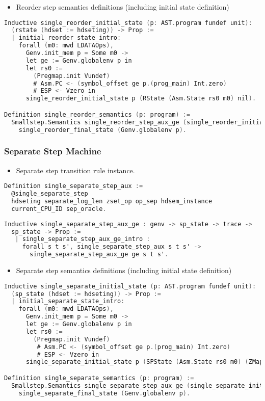 \begin{itemize}[leftmargin=*]
\item Reorder step semantics definitions (including initial state definition)
\end{itemize}
\begin{lstlisting}[language=C]
Inductive single_reorder_initial_state (p: AST.program fundef unit): 
  (rstate (hdset := hdseting)) -> Prop :=
  | initial_reorder_state_intro: 
    forall (m0: mwd LDATAOps),
      Genv.init_mem p = Some m0 ->
      let ge := Genv.globalenv p in
      let rs0 :=
        (Pregmap.init Vundef)
        # Asm.PC <- (symbol_offset ge p.(prog_main) Int.zero)
        # ESP <- Vzero in
      single_reorder_initial_state p (RState (Asm.State rs0 m0) nil).

Definition single_reorder_semantics (p: program) :=
  Smallstep.Semantics single_reorder_step_aux_ge (single_reorder_initial_state p) 
    single_reorder_final_state (Genv.globalenv p).
\end{lstlisting}

\subsubsection{Separate Step Machine}
\begin{itemize}[leftmargin=*]
\item Separate step transition rule instance.
\end{itemize}
\begin{lstlisting}[language=C]
Definition single_separate_step_aux :=
  @single_separate_step
  hdseting separate_log_len zset_op op_sep hdsem_instance
  current_CPU_ID sep_oracle.
    
Inductive single_separate_step_aux_ge : genv -> sp_state -> trace -> 
  sp_state -> Prop :=
   | single_separate_step_aux_ge_intro : 
     forall s t s', single_separate_step_aux s t s' -> 
       single_separate_step_aux_ge ge s t s'.
\end{lstlisting}

\begin{itemize}[leftmargin=*]
\item Separate step semantics definitions (including initial state definition)
\end{itemize}
\begin{lstlisting}[language=C]
Inductive single_separate_initial_state (p: AST.program fundef unit): 
  (sp_state (hdset := hdseting)) -> Prop :=
  | initial_separate_state_intro: 
    forall (m0: mwd LDATAOps),
      Genv.init_mem p = Some m0 ->
      let ge := Genv.globalenv p in
      let rs0 :=
        (Pregmap.init Vundef)
         # Asm.PC <- (symbol_offset ge p.(prog_main) Int.zero)
         # ESP <- Vzero in
      single_separate_initial_state p (SPState (Asm.State rs0 m0) (ZMap.init nil)).

Definition single_separate_semantics (p: program) :=
  Smallstep.Semantics single_separate_step_aux_ge (single_separate_initial_state p) 
    single_separate_final_state (Genv.globalenv p).
\end{lstlisting}